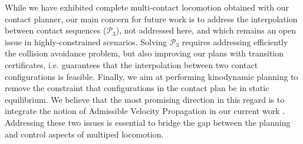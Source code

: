 While we have exhibited complete multi-contact locomotion obtained with our contact planner, our main concern for future work is to address the interpolation
between contact sequences ($\mathcal{P}_3$), not addressed here, and which remains an open issue in highly-constrained scenarios.
Solving $\mathcal{P}_3$ requires addressing efficiently the collision avoidance problem,	but also improving
our plans with transition certificates, i.e. guarantees that the interpolation between two contact configurations is feasible.
Finally, we aim at performing kinodynamic planning to remove the constraint that configurations in the contact plan be in static equilibrium. We believe that the most promising direction in this regard is to integrate the notion of Admissible Velocity Propagation in our current work \citep{DBLP:conf/rss/PhamCN13}.
Addressing these two issues is essential to bridge the gap between the planning and control aspects of multiped locomotion.
